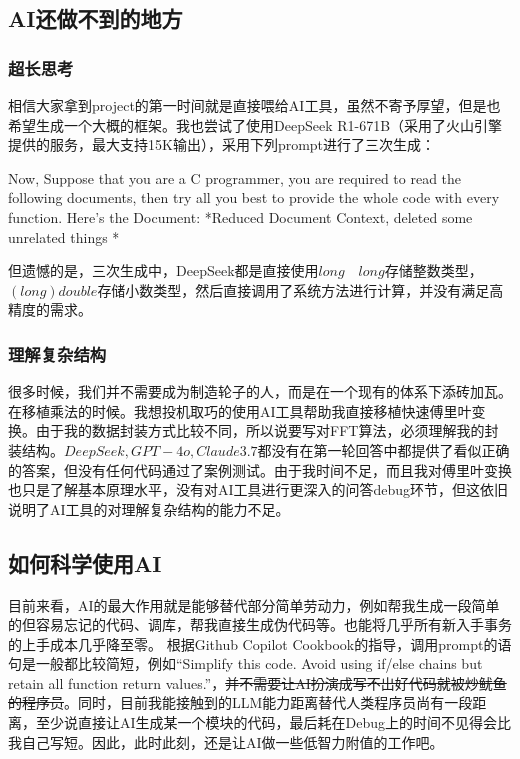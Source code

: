 \documentclass[11pt]{article}
\begin{document}
\subsection{AI还做不到的地方}
\subsubsection{超长思考}
相信大家拿到project的第一时间就是直接喂给AI工具，虽然不寄予厚望，但是也希望生成一个大概的框架。我也尝试了使用DeepSeek R1-671B（采用了火山引擎提供的服务，最大支持15K输出），采用下列prompt进行了三次生成：


\begin{codeline}
    Now, Suppose that you are a C programmer, you are required to read 
    the following documents, then try all you best to provide the whole
    code with every function. Here’s the Document: 
    *Reduced Document Context, deleted some unrelated things *
\end{codeline}
但遗憾的是，三次生成中，DeepSeek都是直接使用$long\quad long$存储整数类型，$(long)double$存储小数类型，然后直接调用了系统方法进行计算，并没有满足高精度的需求。

\subsubsection{理解复杂结构}
很多时候，我们并不需要成为制造轮子的人，而是在一个现有的体系下添砖加瓦。在移植乘法的时候。我想投机取巧的使用AI工具帮助我直接移植快速傅里叶变换。由于我的数据封装方式比较不同，所以说要写对FFT算法，必须理解我的封装结构。$DeepSeek,GPT-4o,Claude 3.7$都没有在第一轮回答中都提供了看似正确的答案，但没有任何代码通过了案例测试。由于我时间不足，而且我对傅里叶变换也只是了解基本原理水平，没有对AI工具进行更深入的问答debug环节，但这依旧说明了AI工具的对理解复杂结构的能力不足。

\subsection{如何科学使用AI}
目前来看，AI的最大作用就是能够替代部分简单劳动力，例如帮我生成一段简单的但容易忘记的代码、调库，帮我直接生成伪代码等。也能将几乎所有新入手事务的上手成本几乎降至零。
根据Github Copilot Cookbook的指导，调用prompt的语句是一般都比较简短，例如“Simplify this code. Avoid using if/else chains but retain all function return values.”，\sout{并不需要让AI扮演成写不出好代码就被炒鱿鱼的程序员}。同时，目前我能接触到的LLM能力距离替代人类程序员尚有一段距离，至少说直接让AI生成某一个模块的代码，最后耗在Debug上的时间不见得会比我自己写短。因此，此时此刻，还是让AI做一些低智力附值的工作吧。
\end{document}
